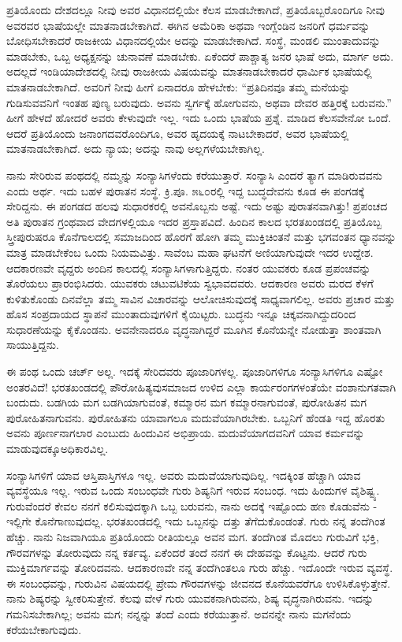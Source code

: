 ಪ್ರತಿಯೊಂದು ದೇಶದಲ್ಲೂ ನೀವು ಅವರ ವಿಧಾನದಲ್ಲಿಯೇ ಕೆಲಸ ಮಾಡಬೇಕಾಗಿದೆ, ಪ್ರತಿಯೊಬ್ಬರೊಂದಿಗೂ ನೀವು ಅವರವರ ಭಾಷೆಯಲ್ಲೇ ಮಾತನಾಡಬೇಕಾಗಿದೆ. ಈಗಿನ ಅಮೆರಿಕಾ ಅಥವಾ ಇಂಗ್ಲೆಂಡಿನ ಜನರಿಗೆ ಧರ್ಮವನ್ನು ಬೋಧಿಸಬೇಕಾದರೆ ರಾಜಕೀಯ ವಿಧಾನದಲ್ಲಿಯೇ ಅದನ್ನು ಮಾಡಬೇಕಾಗಿದೆ. ಸಂಸ್ಥೆ, ಮಂಡಲಿ ಮುಂತಾದುವನ್ನು ಮಾಡಬೇಕು, ಒಬ್ಬ ಅಧ್ಯಕ್ಷನನ್ನು ಚುನಾವಣೆ ಮಾಡಬೇಕು. ಏಕೆಂದರೆ ಪಾಶ್ಚಾತ್ಯ ಜನರ ಭಾಷೆ ಅದು, ಮಾರ್ಗ ಅದು. ಅದಲ್ಲದೆ ಇಂಡಿಯಾದೇಶದಲ್ಲಿ ನೀವು ರಾಜಕೀಯ ವಿಷಯವನ್ನು ಮಾತನಾಡಬೇಕಾದರೆ ಧಾರ್ಮಿಕ ಭಾಷೆಯಲ್ಲಿ ಮಾತನಾಡಬೇಕಾಗಿದೆ. ಅವರಿಗೆ ನೀವು ಹೀಗೆ ಏನಾದರೂ ಹೇಳಬೇಕು: “ಪ್ರತಿದಿನವೂ ತಮ್ಮ ಮನೆಯನ್ನು ಗುಡಿಸುವವನಿಗೆ ಇಂತಹ ಪುಣ್ಯ ಬರುವುದು. ಅವನು ಸ್ವರ್ಗಕ್ಕೆ ಹೋಗುವನು, ಅಥವಾ ದೇವರ ಹತ್ತಿರಕ್ಕೆ ಬರುವನು.” ಹೀಗೆ ಹೇಳದೆ ಹೋದರೆ ಅವರು ಕೇಳುವುದೇ ಇಲ್ಲ. ಇದು ಒಂದು ಭಾಷೆಯ ಪ್ರಶ್ನೆ. ಮಾಡಿದ ಕೆಲಸವೇನೋ ಒಂದೆ. ಆದರೆ ಪ್ರತಿಯೊಂದು ಜನಾಂಗದವರೊಂದಿಗೂ, ಅವರ ಹೃದಯಕ್ಕೆ ನಾಟಬೇಕಾದರೆ, ಅವರ ಭಾಷೆಯಲ್ಲಿ ಮಾತನಾಡಬೇಕಾಗಿದೆ. ಅದು ನ್ಯಾಯ; ಅದನ್ನು ನಾವು ಅಲ್ಲಗಳೆಯಬೇಕಾಗಿಲ್ಲ.

ನಾನು ಸೇರಿರುವ ಪಂಥದಲ್ಲಿ ನಮ್ಮನ್ನು ಸಂನ್ಯಾಸಿಗಳೆಂದು ಕರೆಯುತ್ತಾರೆ. ಸಂನ್ಯಾಸಿ ಎಂದರೆ ತ್ಯಾಗ ಮಾಡಿರುವವನು ಎಂದು ಅರ್ಥ. ಇದು ಬಹಳ ಪುರಾತನ ಸಂಸ್ಥೆ. ಕ್ರಿ.ಪೂ. ೫೬೦ರಲ್ಲಿ ಇದ್ದ ಬುದ್ಧದೇವನು ಕೂಡ ಈ ಪಂಗಡಕ್ಕೆ ಸೇರಿದ್ದನು. ಈ ಪಂಗಡದ ಹಲವು ಸುಧಾರಕರಲ್ಲಿ ಅವನೊಬ್ಬನು ಅಷ್ಟೆ. ಇದು ಅಷ್ಟು ಪುರಾತನವಾಗಿತ್ತು! ಪ್ರಪಂಚದ ಅತಿ ಪುರಾತನ ಗ್ರಂಥವಾದ ವೇದಗಳಲ್ಲಿಯೂ ಇದರ ಪ್ರಸ್ತಾಪವಿದೆ. ಹಿಂದಿನ ಕಾಲದ ಭರತಖಂಡದಲ್ಲಿ ಪ್ರತಿಯೊಬ್ಬ ಸ್ತ್ರೀಪುರುಷರೂ ಕೊನೆಗಾಲದಲ್ಲಿ ಸಮಾಜದಿಂದ ಹೊರಗೆ ಹೋಗಿ ತಮ್ಮ ಮುಕ್ತಿಚಿಂತನೆ ಮತ್ತು ಭಗವಂತನ ಧ್ಯಾನವನ್ನು ಮಾತ್ರ ಮಾಡಬೇಕೆಂಬ ಒಂದು ನಿಯಮವಿತ್ತು. ಸಾವೆಂಬ ಮಹಾ ಘಟನೆಗೆ ಅಣಿಯಾಗುವುದೇ ಇದರ ಉದ್ದೇಶ. ಆದಕಾರಣವೇ ವೃದ್ದರು ಅಂದಿನ ಕಾಲದಲ್ಲಿ ಸಂನ್ಯಾಸಿಗಳಾಗುತ್ತಿದ್ದರು. ನಂತರ ಯುವಕರು ಕೂಡ ಪ್ರಪಂಚವನ್ನು ತೊರೆಯಲು ಪ್ರಾರಂಭಿಸಿದರು. ಯುವಕರು ಚಟುವಟಿಕೆಯ ಸ್ವಭಾವದವರು. ಆದಕಾರಣ ಅವರು ಮರದ ಕೆಳಗೆ ಕುಳಿತುಕೊಂಡು ದಿನವೆಲ್ಲಾ ತಮ್ಮ ಸಾವಿನ ವಿಚಾರವನ್ನು ಆಲೋಚಿಸುವುದಕ್ಕೆ ಸಾಧ್ಯವಾಗಲಿಲ್ಲ. ಅವರು ಪ್ರಚಾರ ಮತ್ತು ಹೊಸ ಸಂಪ್ರದಾಯದ ಸ್ಥಾಪನೆ ಮುಂತಾದುವುಗಳಿಗೆ ಕೈಯಿಟ್ಟರು. ಬುದ್ಧನು ಇನ್ನೂ ಚಿಕ್ಕವನಾಗಿದ್ದುದರಿಂದ ಸುಧಾರಣೆಯನ್ನು ಕೈಕೊಂಡನು. ಅವನೇನಾದರೂ ವೃದ್ಧನಾಗಿದ್ದರೆ ಮೂಗಿನ ಕೊನೆಯನ್ನೇ ನೋಡುತ್ತಾ ಶಾಂತವಾಗಿ ಸಾಯುತ್ತಿದ್ದನು.

ಈ ಪಂಥ ಒಂದು ಚರ್ಚ್ ಅಲ್ಲ. ಇದಕ್ಕೆ ಸೇರಿದವರು ಪೂಜಾರಿಗಳಲ್ಲ. ಪೂಜಾರಿಗಳಿಗೂ ಸಂನ್ಯಾಸಿಗಳಿಗೂ ಎಷ್ಟೋ ಅಂತರವಿದೆ! ಭರತಖಂಡದಲ್ಲಿ ಪೌರೋಹಿತ್ಯವು\break ಸಮಾಜದ ಉಳಿದ ಎಲ್ಲಾ ಕಾರ್ಯರಂಗಗಳಂತೆಯೇ ವಂಶಾನುಗತವಾಗಿ ಬಂದುದು. ಬಡಗಿಯ ಮಗ ಬಡಗಿಯಾಗುವಂತೆ, ಕಮ್ಮಾರನ ಮಗ ಕಮ್ಮಾರನಾಗುವಂತೆ, ಪುರೋಹಿತನ ಮಗ ಪುರೋಹಿತನಾಗುವನು. ಪುರೋಹಿತನು ಯಾವಾಗಲೂ ಮದುವೆಯಾಗಿರಬೇಕು. ಒಬ್ಬನಿಗೆ ಹೆಂಡತಿ ಇದ್ದ ಹೊರತು ಅವನು ಪೂರ್ಣನಾಗಲಾರ ಎಂಬುದು ಹಿಂದುವಿನ ಅಭಿಪ್ರಾಯ. ಮದುವೆಯಾಗದವನಿಗೆ ಯಾವ ಕರ್ಮವನ್ನು ಮಾಡುವುದಕ್ಕೂ\break ಅಧಿಕಾರವಿಲ್ಲ.

ಸಂನ್ಯಾಸಿಗಳಿಗೆ ಯಾವ ಆಸ್ತಿಪಾಸ್ತಿಗಳೂ ಇಲ್ಲ. ಅವರು ಮದುವೆಯಾಗುವುದಿಲ್ಲ. ಇದಕ್ಕಿಂತ ಹೆಚ್ಚಾಗಿ ಯಾವ ವ್ಯವಸ್ಥೆಯೂ ಇಲ್ಲ. ಇರುವ ಒಂದು ಸಂಬಂಧವೇ ಗುರು ಶಿಷ್ಯನಿಗೆ ಇರುವ ಸಂಬಂಧ. ಇದು ಹಿಂದುಗಳ ವೈಶಿಷ್ಟ್ಯ. ಗುರುವೆಂದರೆ ಕೇವಲ ನನಗೆ ಕಲಿಸುವುದಕ್ಕಾಗಿ ಒಬ್ಬ ಬರುವನು, ನಾನು ಅದಕ್ಕೆ ಇಷ್ಟೊಂದು ಹಣ ಕೊಡುವೆನು - ಇಲ್ಲಿಗೇ ಕೊನೆಗಾಣುವುದಲ್ಲ. ಭರತಖಂಡದಲ್ಲಿ ಇದು ಒಬ್ಬನನ್ನು ದತ್ತು ತೆಗೆದುಕೊಂಡಂತೆ. ಗುರು ನನ್ನ ತಂದೆಗಿಂತ ಹೆಚ್ಚು. ನಾನು ನಿಜವಾಗಿಯೂ ಪ್ರತಿಯೊಂದು ರೀತಿಯಲ್ಲೂ ಅವನ ಮಗ. ತಂದೆಗಿಂತ ಮೊದಲು ಗುರುವಿಗೆ ಭಕ್ತಿ, ಗೌರವಗಳನ್ನು ತೋರುವುದು ನನ್ನ ಕರ್ತವ್ಯ. ಏಕೆಂದರೆ ತಂದೆ ನನಗೆ ಈ ದೇಹವನ್ನು ಕೊಟ್ಟನು. ಆದರೆ ಗುರು ಮುಕ್ತಿಮಾರ್ಗವನ್ನು ತೋರಿದವನು. ಆದಕಾರಣವೇ ನನ್ನ ತಂದೆಗಿಂತಲೂ ಗುರು ಹೆಚ್ಚು. ಇದೊಂದೇ ಇರುವ ವ್ಯವಸ್ಥೆ. ಈ ಸಂಬಂಧವನ್ನು, ಗುರುವಿನ ವಿಷಯದಲ್ಲಿ ಪ್ರೇಮ ಗೌರವಗಳನ್ನು ಜೀವನದ ಕೊನೆಯವರೆಗೂ ಉಳಿಸಿಕೊಳ್ಳುತ್ತೇನೆ. ನಾನು ಶಿಷ್ಯರನ್ನು ಸ್ವೀಕರಿಸುತ್ತೇನೆ. ಕೆಲವು ವೇಳೆ ಗುರು ಯುವಕನಾಗಿರುವನು, ಶಿಷ್ಯ ವೃದ್ಧನಾಗಿರುವನು. ಇದನ್ನು ಗಮನಿಸಬೇಕಾಗಿಲ್ಲ; ಅವನು ಮಗ; ನನ್ನನ್ನು ತಂದೆ ಎಂದು ಕರೆಯುತ್ತಾನೆ. ಅವನನ್ನೇ ನಾನು ಮಗನೆಂದು ಕರೆಯಬೇಕಾಗುವುದು.

